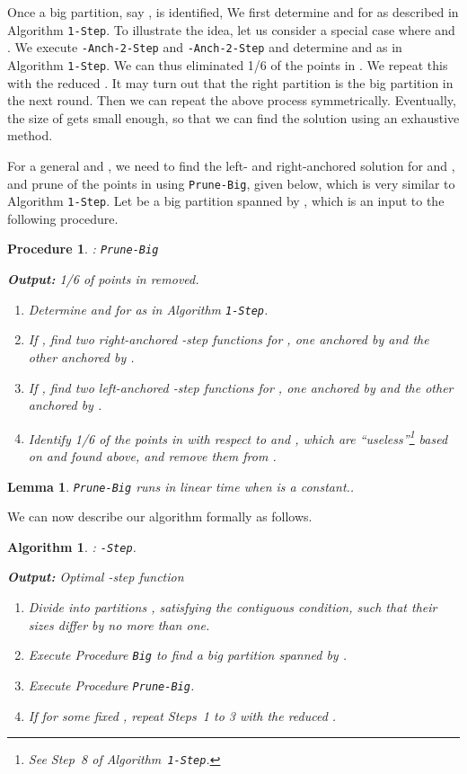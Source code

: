 \documentclass[preprint,10pt]{elsarticle}
\newcommand{\QED}{\hfill}
\newtheorem{lemma}{Lemma}
\newtheorem{algorithm}{Algorithm}
\newtheorem{procedure}{Procedure}
\begin{document}
Once a big partition, say , is identified,
We first determine  and  for  as described in Algorithm {\tt 1-Step}.
To illustrate the idea,
let us consider a special case where  and .
We execute {\tt -Anch-2-Step} and  {\tt -Anch-2-Step}
and determine  and  as in  Algorithm {\tt 1-Step}.
We can thus eliminated 1/6 of the points in .
We repeat this with the reduced .
It may turn out that the right partition is the big partition in the next round.
Then we can repeat the above process symmetrically.
Eventually, the size of  gets small enough,
so that we can find the solution using an exhaustive method.

For a general  and ,
we need to find the left- and right-anchored solution for  and ,
and prune  of the points in  using {\tt Prune-Big}, given below,
which is very similar to Algorithm {\tt 1-Step}.
Let  be a big partition spanned by ,
which is an input to the following procedure.
\begin{procedure}{\rm :} {\tt Prune-Big}

\noindent
{\bf Output:} 1/6 of points in  removed.


\begin{enumerate}
\item
Determine  and  for  as in Algorithm {\tt 1-Step}. 
\item 
If , find two right-anchored -step functions  for ,
one anchored by  and the other anchored by .
\item
If , find two left-anchored -step functions
  for ,
one anchored by  and the other anchored by .
\item
Identify 1/6 of the points in  with respect to  and ,
which are ``useless''\footnote{See Step~8 of Algorithm~{\tt 1-Step}.}
based on 
and  found above,
and remove them from . 
\end{enumerate}
\end{procedure}



\begin{lemma}\label{lem:anchored}
{\tt Prune-Big} runs in linear time when  is a constant..
\QED
\end{lemma}

We can now describe our algorithm formally as follows.

\begin{algorithm}{\rm :} {\tt -Step}. 

\noindent
{\bf Output:}  Optimal -step function 
\begin{enumerate}
\item 
Divide  into partitions ,
satisfying the contiguous condition,
such that their sizes differ by no more than one.
\item 
Execute Procedure {\tt Big} to find a big partition 
spanned by . 
\item
Execute Procedure {\tt Prune-Big}.
\item
If  for some fixed , 
repeat Steps~1 to 3 with the reduced .
\end{enumerate}
\end{algorithm}
\end{document}
